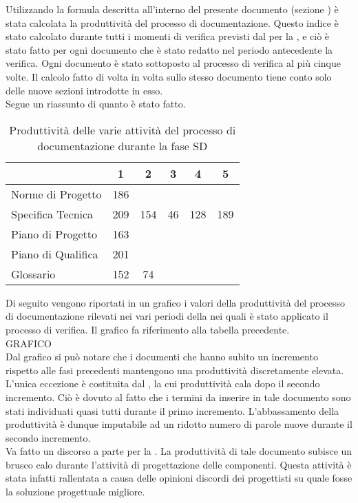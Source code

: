 			Utilizzando la formula descritta all'interno del presente documento (sezione ) è stata calcolata la produttività del processo di documentazione. Questo indice è stato calcolato durante tutti i momenti di verifica previsti dal  per	la , e ciò è stato fatto per ogni documento che è stato redatto nel periodo antecedente la verifica. Ogni documento è stato sottoposto al processo di verifica al più cinque volte. Il calcolo fatto di volta in volta sullo stesso documento tiene conto solo delle nuove sezioni introdotte in esso.\\
				Segue un riassunto di quanto è stato fatto.
				\begin{table}[H]
					\centering
					\begin{tabu}{| l | c | c | c | c | c |}
						\hline
							&1	&2	&3	&4	&5	\\ \hline
						Norme di Progetto	& 186 &	&	&	& \\ \hline
						Specifica Tecnica &	209 & 154 & 46	&	128 & 189 \\ \hline
						Piano di Progetto	& 163 &	&	&	& \\ \hline
						Piano di Qualifica	& 201	&	&	&	&\\ \hline
						Glossario & 152 & 74 & & &\\ \hline
					\end{tabu}
					\caption{Produttività delle varie attività del processo di documentazione durante la fase SD}
				\end{table}
				Di seguito vengono riportati in un grafico i valori della produttività del processo di documentazione rilevati nei vari periodi della  nei quali è stato applicato il processo di verifica. Il grafico fa riferimento alla tabella precedente.\\
				GRAFICO\\
				Dal grafico si può notare che i documenti che hanno subito un incremento rispetto alle fasi precedenti mantengono una produttività discretamente elevata. L'unica eccezione è costituita dal , la cui produttività cala dopo il secondo incremento. Ciò è dovuto al fatto che i termini da inserire in tale documento sono stati individuati quasi tutti durante il primo incremento. L'abbassamento della produttività è dunque imputabile ad un ridotto numero di parole nuove durante il secondo incremento.\\
				Va fatto un discorso a parte per la . La produttività di tale documento subisce un brusco calo durante l'attività di progettazione delle componenti. Questa attività è stata infatti rallentata a causa delle opinioni discordi dei progettisti su quale fosse la soluzione progettuale migliore.
			
